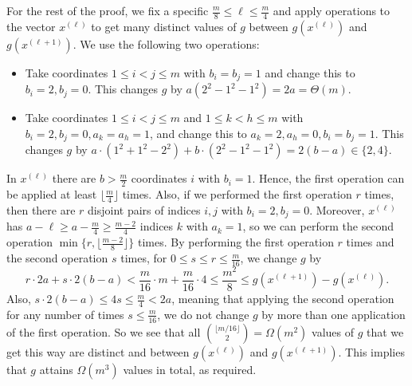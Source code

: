 \documentclass[11pt]{article}
\let\oldendproof\endproof
\renewenvironment{proof}[1][\proofname]{%
	\oldproof[\bf #1]%
}{\oldendproof}
\theoremstyle{plain}
\begin{document}
\begin{proof}[Proof of Lemma \ref{additional-lemma}]
	For the rest of the proof, we fix a specific $\frac{m}{8} \leq \ell \leq \frac{m}{4}$ and apply operations to the vector $x^{(\ell)}$ to get many distinct values of $g$ between  $g(x^{(\ell)})$ and $g(x^{(\ell+1)})$. 
    We use the following two operations:
    \begin{itemize}
        \item Take coordinates $1 \leq i < j \leq m$ with $b_i = b_j = 1$ and change this to $b_i = 2, b_j = 0$. This changes $g$ by $a(2^2-1^2-1^2) = 2a = \Theta(m)$. 
        \item Take coordinates $1 \leq i < j \leq m$ and $1 \leq k < h \leq m$ with 
        $b_i = 2, b_j = 0, a_k = a_h = 1$, and change this to $a_k = 2, a_h = 0, b_i = b_j = 1$. This changes $g$ by 
        $a \cdot (1^2+1^2-2^2) + b \cdot (2^2-1^2-1^2) = 2(b-a) \in \{2,4\}$.  
    \end{itemize}
    In $x^{(\ell)}$ there are $b > \frac{m}{2}$ coordinates $i$ with $b_i=1$. Hence, the first operation can be applied at least $\lfloor \frac{m}{4} \rfloor$ times. Also, if we performed the first operation $r$ times, then there are $r$ disjoint pairs of indices $i,j$ with $b_i = 2, b_j = 0$. Moreover, $x^{(\ell)}$ has $a-\ell \geq a - \frac{m}{4} \geq \frac{m-2}{4}$ indices $k$ with $a_k=1$, so we can perform the second operation 
    $\min\{r,\lfloor \frac{m-2}{8}\rfloor\}$ times. 
    By performing the first operation $r$ times and the second operation $s$ times, for $0 \leq s \leq r \leq \frac{m}{16}$, we change $g$ by 
    $$
    r \cdot 2a + s \cdot 2(b-a) <
    \frac{m}{16} \cdot m + \frac{m}{16} \cdot 4 \leq \frac{m^2}{8} \leq g(x^{(\ell+1)}) - g(x^{(\ell)}).
    $$
    Also,
    $s \cdot 2(b-a) \leq 4s \leq \frac{m}{4} < 2a$, 
    meaning that applying the second operation for any number of times $s \leq \frac{m}{16}$, we do not change $g$ by more than one application of the first operation. So we see that all $\binom{\lfloor m/16 \rfloor}{2} = \Omega(m^2)$ values of $g$ that we get this way are distinct and between $g(x^{(\ell)})$ and $g(x^{(\ell+1)})$. This implies that $g$ attains $\Omega(m^3)$ values in total, as required. 
\end{proof}
\end{document}
